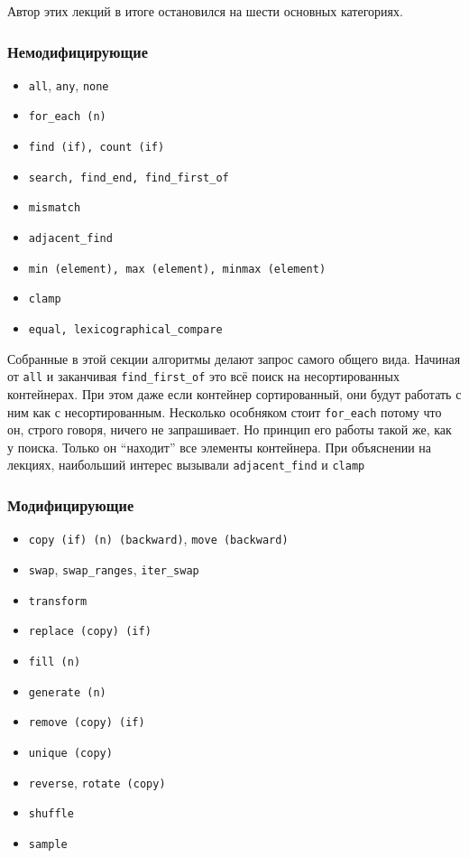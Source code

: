 \documentclass[a4paper,12pt,oneside]{book}
\begin{document}
Автор этих лекций в итоге остановился на шести основных категориях.

\subsubsection{Немодифицирующие}

\begin{itemize}
\item \lstinline!all!, \lstinline!any!, \lstinline!none!
\item \lstinline!for_each (n)!
\item \lstinline!find (if), count (if)!
\item \lstinline!search, find_end, find_first_of!
\item \lstinline!mismatch!
\item \lstinline!adjacent_find!
\item \lstinline!min (element), max (element), minmax (element)!
\item \lstinline!clamp!
\item \lstinline!equal, lexicographical_compare!
\end{itemize}

Собранные в этой секции алгоритмы делают запрос самого общего вида. Начиная от \lstinline!all! и заканчивая \lstinline!find_first_of! это всё поиск на несортированных контейнерах. При этом даже если контейнер сортированный, они будут работать с ним как с несортированным.
Несколько особняком стоит \lstinline!for_each! потому что он, строго говоря, ничего не запрашивает. Но принцип его работы такой же, как у поиска. Только он ``находит'' все элементы контейнера.
При объяснении на лекциях, наибольший интерес вызывали \lstinline!adjacent_find! и \lstinline!clamp! 

\subsubsection{Модифицирующие}

\begin{itemize}
\item \lstinline!copy (if) (n) (backward)!, \lstinline!move (backward)!
\item \lstinline!swap!, \lstinline!swap_ranges!, \lstinline!iter_swap!
\item \lstinline!transform!
\item \lstinline!replace (copy) (if)!
\item \lstinline!fill (n)!
\item \lstinline!generate (n)!
\item \lstinline!remove (copy) (if)!
\item \lstinline!unique (copy)!
\item \lstinline!reverse!, \lstinline!rotate (copy)!
\item \lstinline!shuffle!
\item \lstinline!sample!
\end{itemize}
\end{document}
